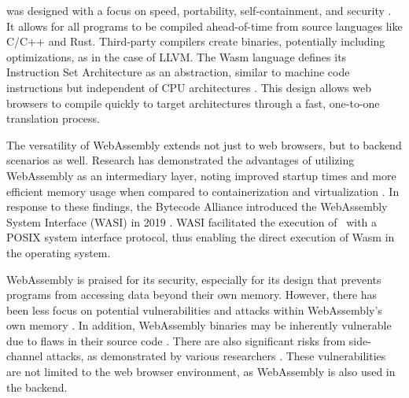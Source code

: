 
\Wasm was designed with a focus on speed, portability, self-containment, and security \cite{Haas_2017}.
It allows for all programs to be compiled ahead-of-time from source languages like C/C++ and Rust.
Third-party compilers create \Wasm binaries, potentially including optimizations, as in the case of LLVM.
The Wasm language defines its Instruction Set Architecture as an abstraction, similar to machine code instructions but independent of CPU architectures \cite{wasm_spec}.
This design allows web browsers to compile quickly to target architectures through a fast, one-to-one translation process.


The versatility of WebAssembly extends not just to web browsers, but to backend scenarios as well. 
Research has demonstrated the advantages of utilizing WebAssembly as an intermediary layer, noting improved startup times and more efficient memory usage when compared to containerization and virtualization \cite{pMendkiServerless, 1244493Jacobsson}. 
In response to these findings, the Bytecode Alliance introduced the WebAssembly System Interface (WASI) in 2019 \cite{bytecodealliance, WASI}. 
WASI facilitated the execution of \Wasm\ with a POSIX system interface protocol, thus enabling the direct execution of Wasm in the operating system. 




WebAssembly is praised for its security, especially for its design that prevents programs from accessing data beyond their own memory. 
However, there has been less focus on potential vulnerabilities and attacks within WebAssembly's own memory \cite{usenixWasm2020}.
In addition, WebAssembly binaries may be inherently vulnerable due to flaws in their source code \cite{DeRoover2022}. 
There are also significant risks from side-channel attacks, as demonstrated by various researchers \cite{ret2spec, 10.1145/3488932.3517411, Swivel}. 
These vulnerabilities are not limited to the web browser environment, as WebAssembly is also used in the backend.


